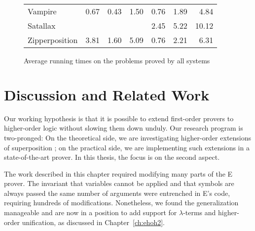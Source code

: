 \begin{rep}
\begin{figure}[ht!]
\begin{tabular}{@{}l@{\hskip 1.5em}r@{\hskip 1em}r@{\hskip 1em}r@{\hskip 1.5em}r@{\hskip 1em}r@{\hskip 1em}r@{}}
Vampire                     & 0.67          & 0.43             & 1.50          &  0.76            & 1.89             & 4.84 \\%
Satallax                    &               &                  &               &  2.45            & 5.22             & 10.12 \\%
Zipperposition              & 3.81          & 1.60             & 5.09          &  0.76            & 2.21             & 6.31
\end{tabular}
\caption{Average running times on the problems proved by all systems}
\label{fig:timing}
\end{figure}
\end{rep}

\section{Discussion and Related Work}
\label{sec:ehoh:discussion-and-related-work}

\begin{rep}
  Our working hypothesis is that it is possible to extend %
  first-order provers to higher-order logic without slowing them down unduly.
  Our research program is two-pronged:
  On the theoretical side, we are
  investigating higher-order extensions of superposition
  \cite{bbcw-21-lfho,bbtvw-21-sup-lam,vn-20-bools};
  on the practical side, we are implementing such extensions in a
  state-of-the-art prover. In this thesis, the focus is on the second aspect.
  
  The work described in this chapter required modifying many parts of the E
  prover. The invariant that variables cannot be applied and that symbols are always
  passed the same number of arguments were entrenched in E's code,
  requiring hundreds of modifications. Nonetheless,
  we found the generalization manageable and are now in a position to add
  support for $\lambda$-terms and higher-order unification, as discussed in Chapter~\ref{ch:ehoh2}.
  \end{rep}
  
